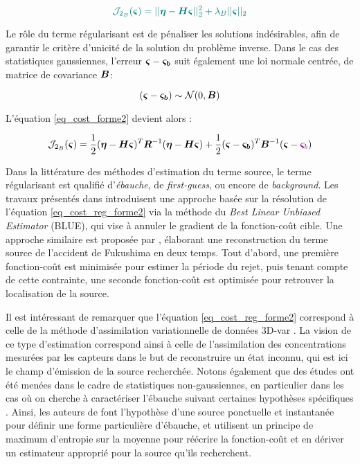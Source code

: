  \begin{equation}
 \NdFS{
 \mathcal{J}_{2_B}(\VecSigma) = ||\VecObs - \MatH \VecSigma||_2^2 + \lambda_B ||\VecSigma||_2
 \label{eq_cost_MCO_reg}
}
 \end{equation}
 
 Le rôle du terme régularisant est de pénaliser les solutions indésirables, afin de garantir le critère d'unicité de la solution du problème inverse.  Dans le cas des statistiques gaussiennes, l'erreur  ${\bm{\varsigma}} - {\bm{\varsigma_b}}$ suit également une loi normale centrée, de matrice de covariance ${\bm{B}}$:
  
  \begin{equation}
  ({\bm{\varsigma}} - {\bm{\varsigma_b}}) \sim \mathcal{N}(0,{\bm{B}})
  \label{eq_erreur_ebauche}
  \end{equation}
  
  L'équation \eqref{eq_cost_forme2} devient alors \cite{Winiarek2011}: 
 
\begin{equation}
\mathcal{J}_{2_B}(\VecSigma) = \dfrac{1}{2}(\VecObs - \MatH \VecSigma)^T \MatR^{-1}(\VecObs - \MatH\VecSigma) + \dfrac{1}{2}(\VecSigma - \VecSigmaB)^T\MatB^{-1}(\VecSigma - \NdPA{\VecSigma_b})
\label{eq_cost_reg_forme2}
\end{equation}

Dans la littérature des méthodes d'estimation du terme source, le terme régularisant est qualifié d'\textit{ébauche}, de \textit{first-guess}, ou encore de \textit{background}. Les travaux présentés dans \cite{Winiarek2012} introduisent une approche basée sur la résolution de l'équation \eqref{eq_cost_reg_forme2} via la méthode du \textit{Best Linear Unbiased Estimator} (BLUE), qui vise à annuler le gradient de la fonction-coût cible. Une approche similaire est proposée par \cite{Saunier2013}, élaborant une reconstruction du terme source de l'accident de Fukushima en deux temps. Tout d'abord, une première fonction-coût est minimisée pour estimer la période du rejet, puis tenant compte de cette contrainte, une seconde fonction-coût est optimisée pour retrouver la localisation de la source. 

Il est intéressant de remarquer que l'équation \eqref{eq_cost_reg_forme2} correspond à celle de la méthode d'assimilation variationnelle de données 3D-var \cite{Courtier1998}. La vision de ce type d'estimation correspond  ainsi à celle de l'assimilation des concentrations mesurées par les capteurs dans le but de reconstruire un état inconnu, qui est ici le champ d'émission de la source recherchée. Notons également que des études ont été menées dans le cadre de statistiques non-gaussiennes, en particulier dans les cas où on cherche à caractériser l'ébauche suivant certaines hypothèses spécifiques \cite{Bocquet2005a}. Ainsi, les auteurs de \cite{Krysta2007} font l'hypothèse d'une source ponctuelle et instantanée pour définir une forme particulière d'ébauche, et utilisent un principe de maximum d'entropie sur la moyenne \cite{Jaynes1957} pour réécrire la fonction-coût et en dériver un estimateur approprié pour la source qu'ils recherchent.\\

